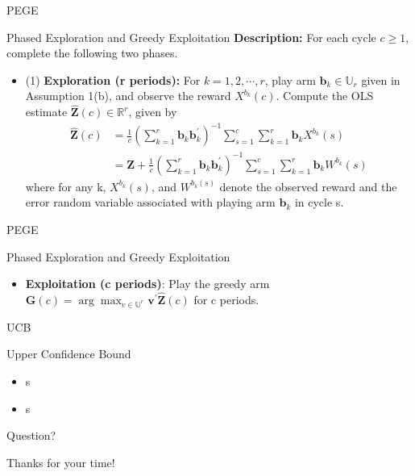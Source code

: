 \documentclass[serif]{beamer}
\begin{document}
\begin{frame}{PEGE}

\begin{block}{Phased Exploration and Greedy Exploitation}
\textbf{Description:} For each cycle $c\geq 1$, complete the following two phases.
\begin{itemize}
\item (1) \textbf{Exploration (r periods):} For $k=1,2,\cdots,r$, play arm $\textbf{b}_{k}\in \mathbb{U}_{r}$ given in Assumption 1(b), and observe the reward $X^{b_{k}}(c)$. Compute the OLS estimate $\hat{\textbf{Z}}(c)\in \mathbb{R}^{r}$, given by
\begin{align}
\hat{\textbf{Z}}(c)&=\frac{1}{c}(\sum_{k=1}^{r}\textbf{b}_{k}\textbf{b}_{k}^{'})^{-1}\sum_{s=1}^{c}\sum_{k=1}^{r}\textbf{b}_{k}X^{b_{k}}(s) \nonumber \\
&=\textbf{Z}+\frac{1}{c}(\sum_{k=1}^{r}\textbf{b}_{k}\textbf{b}_{k}^{'})^{-1}\sum_{s=1}^{c}\sum_{k=1}^{r}\textbf{b}_{k}W^{b_{k}}(s) \nonumber 
\end{align}
where for any k, $X^{b_{k}}(s)$, and $W^{b_{k}(s)}$ denote the observed reward and the error random variable associated with playing arm $\textbf{b}_{k}$ in cycle s.
\end{itemize}

\end{block}

\end{frame}


\begin{frame}{PEGE}

\begin{block}{Phased Exploration and Greedy Exploitation}
\begin{itemize}
\item \textbf{Exploitation (c periods)}: Play the greedy arm $\textbf{G}(c)=\arg \max_{v\in \mathbb{U}^{r}}\textbf{v}^{'}\hat{\textbf{Z}}(c)$ for c periods.
\end{itemize}
\end{block}


\end{frame}
\begin{frame}{UCB}
\begin{block}{Upper Confidence Bound}
\begin{itemize}
\item s
\item s
\end{itemize}

\end{block}

\end{frame}







\begin{frame}{Question?}
\begin{center}
\Huge{Thanks for your time!}
\end{center}
\end{frame}
\end{document}
